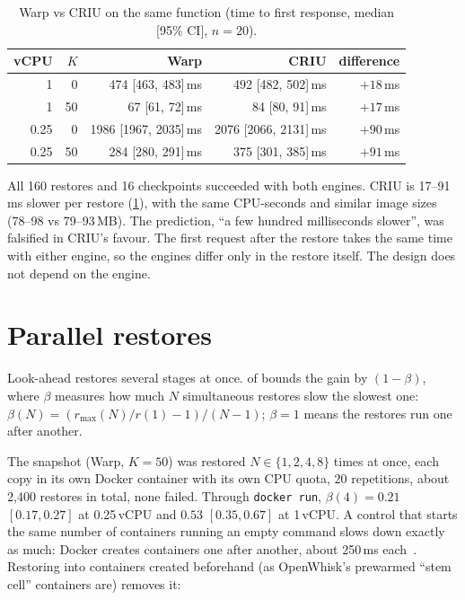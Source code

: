 \begin{table}[htbp]
\centering
\caption{Warp vs CRIU on the same function (time to first response, median [95\% CI], $n = 20$).}
\label{tab:m-engines}
\small
\begin{tabular}{@{}rrrrr@{}}
\toprule
vCPU & $K$ & Warp & CRIU & difference \\
\midrule
1 & 0 & 474 [463, 483]\,ms & 492 [482, 502]\,ms & $+18$\,ms \\
1 & 50 & 67 [61, 72]\,ms & 84 [80, 91]\,ms & $+17$\,ms \\
0.25 & 0 & 1986 [1967, 2035]\,ms & 2076 [2066, 2131]\,ms & $+90$\,ms \\
0.25 & 50 & 284 [280, 291]\,ms & 375 [301, 385]\,ms & $+91$\,ms \\
\bottomrule
\end{tabular}
\end{table}

All 160 restores and 16 checkpoints succeeded with both engines. CRIU is 17--91\,ms slower per
restore (\cref{tab:m-engines}), with the same CPU-seconds and similar image sizes (78--98 vs
79--93\,MB). The prediction, ``a few hundred milliseconds slower'', was falsified in CRIU's
favour. The first request after the restore takes the same time with either engine, so the
engines differ only in the restore itself. The design does not depend on the engine.

\section{Parallel restores}
\label{sec:m-parallel}

Look-ahead restores several stages at once.  of 
bounds the gain by $(1 - \beta)$, where $\beta$ measures how much $N$ simultaneous restores slow
the slowest one: $\beta(N) = (r_{\max}(N)/r(1) - 1)/(N - 1)$; $\beta = 1$ means the restores
run one after another.

The snapshot (Warp, $K = 50$) was restored $N \in \{1, 2, 4, 8\}$ times at once, each copy in its
own Docker container with its own CPU quota, 20 repetitions, about 2{,}400 restores in total,
none failed. Through \texttt{docker run}, $\beta(4) = 0.21$ $[0.17, 0.27]$ at 0.25\,vCPU and
$0.53$ $[0.35, 0.67]$ at 1\,vCPU. A control that starts the same number of containers running an
empty command slows down exactly as much: Docker creates containers one after another, about
250\,ms each~\cite{forkroad2025}. Restoring into containers created beforehand (as OpenWhisk's
prewarmed ``stem cell'' containers are) removes it:

